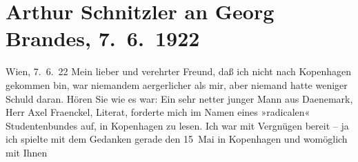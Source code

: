 

         
         \newcommand{\erwaehntePersonen}{Personen: Georg Brandes, Axel Fraenckel, Heinrich Schnitzler, Lili Schnitzler, Olga Schnitzler}
         \newcommand{\erwaehnteInstitutionen}{}
         \newcommand{\erwaehnteOrte}{Orte: Amsterdam, Athen, Berlin, Den Haag, Dänemark, Graz, Griechenland, Kopenhagen, München, Niederlande, Nürnberg, Raimund-Theater, Rotterdam, Universität Wien, Völser Weiher, Wien}
         \newcommand{\erwaehnteWerke}{Werke: Das weite Land. Tragikomödie in fünf Akten, Komödie der Verführung. In drei Akten}
               \section[Arthur Schnitzler an Georg Brandes, 7. 6. 1922]{ Arthur Schnitzler an Georg Brandes, 7. 6. 1922}\nopagebreak{}\rehead{ }\begin{ledgroupsized}[t]{13cm}\normalsize\beginnumbering \toendnotes[C]{\smallbreak\pagebreak[2]} 
\toendnotes[C]{\smallbreak}\pstart
           \raggedleft{}{\pb}Wien, 7. 6. 22\pend
           \pstart
           Mein lieber und verehrter Freund, daß ich nicht nach Kopenhagen gekommen bin, war niemandem
                    aergerlicher als mir, aber niemand hatte weniger Schuld daran. Hören Sie wie es
                    war: Ein sehr netter junger Mann aus Daenemark, Herr Axel Fraenckel,
                    Literat, forderte mich im Namen eines »radicalen« Studentenbundes auf, in Kopenhagen zu lesen. Ich war mit Vergnügen
                    bereit – ja ich spielte mit dem Gedanken gerade den 15 Mai in Kopenhagen und womöglich mit Ihnen

\end{ledgroupsized}
